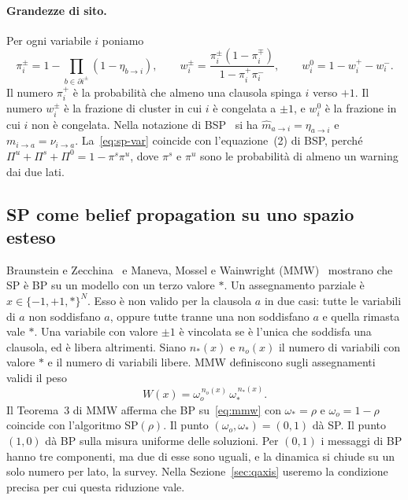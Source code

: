 \paragraph{Grandezze di sito.}
Per ogni variabile $i$ poniamo
\begin{equation}
\pi_i^{\pm}=1-\prod_{b\in\partial i^{\pm}}(1-\eta_{b\to i}),
\qquad
w_i^{\pm}=\frac{\pi_i^{\pm}(1-\pi_i^{\mp})}{1-\pi_i^+\pi_i^-},
\qquad
w_i^{0}=1-w_i^+-w_i^-.
\label{eq:w}
\end{equation}
Il numero $\pi_i^{+}$ è la probabilità che almeno una clausola spinga $i$ verso $+1$.
Il numero $w_i^{\pm}$ è la frazione di cluster in cui $i$ è congelata a $\pm1$, e $w_i^0$ è la frazione in cui $i$ non è congelata.
Nella notazione di BSP~\citep{marino2016bsp} si ha $\hat m_{a\to i}=\eta_{a\to i}$ e $m_{i\to a}=\nu_{i\to a}$.
La~\eqref{eq:sp-var} coincide con l'equazione~(2) di BSP, perché $\Pi^u+\Pi^s+\Pi^0=1-\pi^s\pi^u$, dove $\pi^s$ e $\pi^u$ sono le probabilità di almeno un warning dai due lati.

\subsection{SP come belief propagation su uno spazio esteso}

Braunstein e Zecchina~\citep{braunstein2004surveybp} e Maneva, Mossel e Wainwright (MMW)~\citep{maneva2007survey} mostrano che SP è BP su un modello con un terzo valore $*$.
Un assegnamento parziale è $x\in\{-1,+1,*\}^N$.
Esso è non valido per la clausola $a$ in due casi: tutte le variabili di $a$ non soddisfano $a$, oppure tutte tranne una non soddisfano $a$ e quella rimasta vale $*$.
Una variabile con valore $\pm1$ è vincolata se è l'unica che soddisfa una clausola, ed è libera altrimenti.
Siano $n_*(x)$ e $n_o(x)$ il numero di variabili con valore $*$ e il numero di variabili libere.
MMW definiscono sugli assegnamenti validi il peso
\begin{equation}
W(x)=\omega_o^{\,n_o(x)}\,\omega_*^{\,n_*(x)}.
\label{eq:mmw}
\end{equation}
Il Teorema~3 di MMW afferma che BP su~\eqref{eq:mmw} con $\omega_*=\rho$ e $\omega_o=1-\rho$ coincide con l'algoritmo SP$(\rho)$.
Il punto $(\omega_o,\omega_*)=(0,1)$ dà SP.
Il punto $(1,0)$ dà BP sulla misura uniforme delle soluzioni.
Per $(0,1)$ i messaggi di BP hanno tre componenti, ma due di esse sono uguali, e la dinamica si chiude su un solo numero per lato, la survey.
Nella Sezione~\ref{sec:qaxis} useremo la condizione precisa per cui questa riduzione vale.

